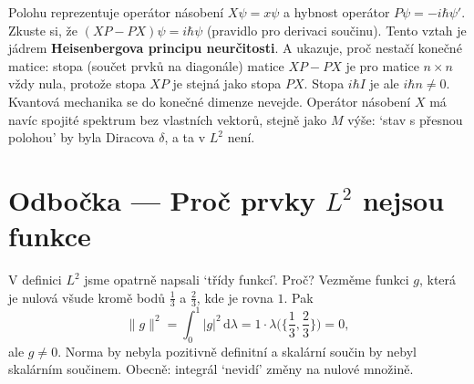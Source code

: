Polohu reprezentuje operátor násobení $X\psi = x\psi$ a hybnost operátor $P\psi = -i\hbar\psi'$. Zkuste si, že $(XP - PX)\psi = i\hbar\psi$ (pravidlo pro derivaci součinu). Tento vztah je jádrem \textbf{Heisenbergova principu neurčitosti}. A ukazuje, proč nestačí konečné matice: stopa (součet prvků na diagonále) matice $XP - PX$ je pro matice $n\times n$ vždy nula, protože stopa $XP$ je stejná jako stopa $PX$. Stopa $i\hbar I$ je ale $i\hbar n\neq 0$. Kvantová mechanika se do konečné dimenze nevejde. Operátor násobení $X$ má navíc spojité spektrum bez vlastních vektorů, stejně jako $M$ výše: `stav s přesnou polohou' by byla Diracova $\delta$, a ta v $L^2$ není.

\section{Odbočka --- Proč prvky \texorpdfstring{$L^2$}{L2} nejsou funkce}

V definici $L^2$ jsme opatrně napsali `třídy funkcí'. Proč? Vezměme funkci $g$, která je nulová všude kromě bodů $\frac{1}{3}$ a $\frac{2}{3}$, kde je rovna $1$. Pak
\begin{equation*}
  \|g\|^2 = \int_0^1|g|^2\,\mathrm{d}\lambda = 1\cdot\lambda\Big(\Big\{\frac{1}{3}, \frac{2}{3}\Big\}\Big) = 0,
\end{equation*}
ale $g\neq 0$. Norma by nebyla pozitivně definitní a skalární součin by nebyl skalárním součinem. Obecně: integrál `nevidí' změny na nulové množině.

\begin{center}
\end{center}


